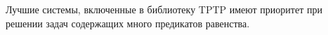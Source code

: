 Лучшие системы, включенные в библиотеку TPTP имеют приоритет при решении задач содержащих много предикатов равенства.











